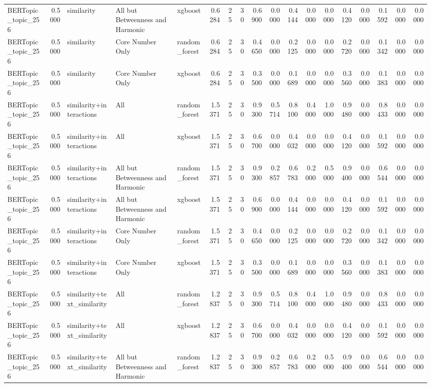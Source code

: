 \begin{tabular}{lrlllrrrrrrrrrrrrr}
BERTopic_topic_256 & 0.5000 & similarity & All but Betweenness and Harmonic & xgboost & 0.6284 & 25 & 30 & 0.6900 & 0.0000 & 0.4144 & 0.0000 & 0.0000 & 0.4120 & 0.0000 & 0.1592 & 0.0000 & 0.0000 \\
BERTopic_topic_256 & 0.5000 & similarity & Core Number Only & random_forest & 0.6284 & 25 & 30 & 0.4650 & 0.0000 & 0.2125 & 0.0000 & 0.0000 & 0.2720 & 0.0000 & 0.1342 & 0.0000 & 0.0000 \\
BERTopic_topic_256 & 0.5000 & similarity & Core Number Only & xgboost & 0.6284 & 25 & 30 & 0.3500 & 0.0000 & 0.1689 & 0.0000 & 0.0000 & 0.3560 & 0.0000 & 0.1383 & 0.0000 & 0.0000 \\
BERTopic_topic_256 & 0.5000 & similarity+interactions & All & random_forest & 1.5371 & 25 & 30 & 0.9300 & 0.5714 & 0.8100 & 0.4000 & 1.0000 & 0.9480 & 0.0000 & 0.8433 & 0.0000 & 0.0000 \\
BERTopic_topic_256 & 0.5000 & similarity+interactions & All & xgboost & 1.5371 & 25 & 30 & 0.6700 & 0.0000 & 0.4032 & 0.0000 & 0.0000 & 0.4120 & 0.0000 & 0.1592 & 0.0000 & 0.0000 \\
BERTopic_topic_256 & 0.5000 & similarity+interactions & All but Betweenness and Harmonic & random_forest & 1.5371 & 25 & 30 & 0.9300 & 0.2857 & 0.6783 & 0.2000 & 0.5000 & 0.9400 & 0.0000 & 0.6544 & 0.0000 & 0.0000 \\
BERTopic_topic_256 & 0.5000 & similarity+interactions & All but Betweenness and Harmonic & xgboost & 1.5371 & 25 & 30 & 0.6900 & 0.0000 & 0.4144 & 0.0000 & 0.0000 & 0.4120 & 0.0000 & 0.1592 & 0.0000 & 0.0000 \\
BERTopic_topic_256 & 0.5000 & similarity+interactions & Core Number Only & random_forest & 1.5371 & 25 & 30 & 0.4650 & 0.0000 & 0.2125 & 0.0000 & 0.0000 & 0.2720 & 0.0000 & 0.1342 & 0.0000 & 0.0000 \\
BERTopic_topic_256 & 0.5000 & similarity+interactions & Core Number Only & xgboost & 1.5371 & 25 & 30 & 0.3500 & 0.0000 & 0.1689 & 0.0000 & 0.0000 & 0.3560 & 0.0000 & 0.1383 & 0.0000 & 0.0000 \\
BERTopic_topic_256 & 0.5000 & similarity+text_similarity & All & random_forest & 1.2837 & 25 & 30 & 0.9300 & 0.5714 & 0.8100 & 0.4000 & 1.0000 & 0.9480 & 0.0000 & 0.8433 & 0.0000 & 0.0000 \\
BERTopic_topic_256 & 0.5000 & similarity+text_similarity & All & xgboost & 1.2837 & 25 & 30 & 0.6700 & 0.0000 & 0.4032 & 0.0000 & 0.0000 & 0.4120 & 0.0000 & 0.1592 & 0.0000 & 0.0000 \\
BERTopic_topic_256 & 0.5000 & similarity+text_similarity & All but Betweenness and Harmonic & random_forest & 1.2837 & 25 & 30 & 0.9300 & 0.2857 & 0.6783 & 0.2000 & 0.5000 & 0.9400 & 0.0000 & 0.6544 & 0.0000 & 0.0000 \\

\end{tabular}

